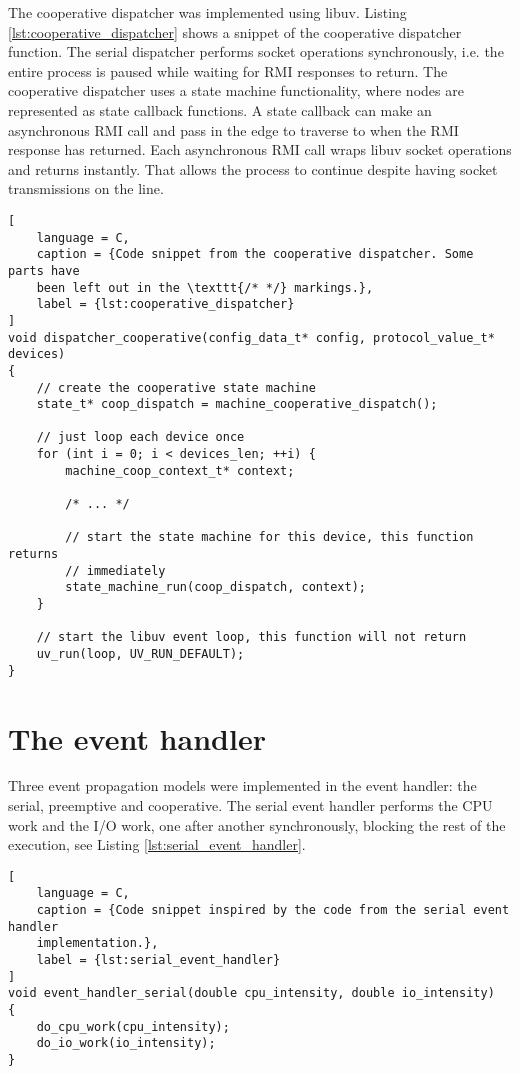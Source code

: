 The cooperative dispatcher was implemented using libuv. Listing
\ref{lst:cooperative_dispatcher} shows a snippet of the cooperative dispatcher
function. The serial dispatcher performs socket operations synchronously, i.e.
the entire process is paused while waiting for RMI responses to return. The
cooperative dispatcher uses a state machine functionality, where nodes are
represented as state callback functions. A state callback can make an
asynchronous RMI call and pass in the edge to traverse to when the RMI response
has returned. Each asynchronous RMI call wraps libuv socket operations and
returns instantly. That allows the process to continue despite having socket
transmissions on the line.

\begin{lstlisting}[
    language = C,
    caption = {Code snippet from the cooperative dispatcher. Some parts have
    been left out in the \texttt{/* */} markings.},
    label = {lst:cooperative_dispatcher}
]
void dispatcher_cooperative(config_data_t* config, protocol_value_t* devices)
{
    // create the cooperative state machine
    state_t* coop_dispatch = machine_cooperative_dispatch();

    // just loop each device once
    for (int i = 0; i < devices_len; ++i) {
        machine_coop_context_t* context;

        /* ... */

        // start the state machine for this device, this function returns
        // immediately
        state_machine_run(coop_dispatch, context);
    }

    // start the libuv event loop, this function will not return
    uv_run(loop, UV_RUN_DEFAULT);
}
\end{lstlisting}

\section{The event handler}
\label{sec:impl_event_handler}

Three event propagation models were implemented in the event handler: the
serial, preemptive and cooperative. The serial event handler performs the CPU
work and the I/O work, one after another synchronously, blocking the rest of the
execution, see Listing \ref{lst:serial_event_handler}.

\begin{lstlisting}[
    language = C,
    caption = {Code snippet inspired by the code from the serial event handler
    implementation.},
    label = {lst:serial_event_handler}
]
void event_handler_serial(double cpu_intensity, double io_intensity)
{
    do_cpu_work(cpu_intensity);
    do_io_work(io_intensity);
}
\end{lstlisting}

